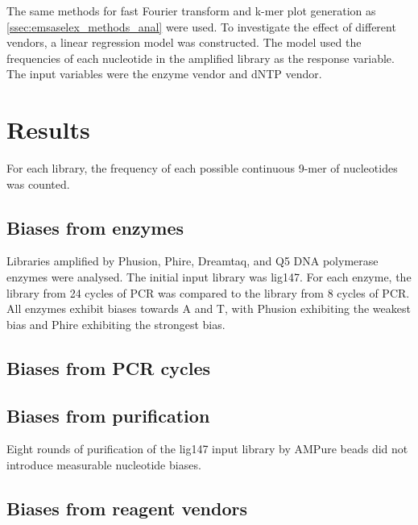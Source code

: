 \documentclass[parskip=full, numbers=noenddot]{scrreprt}
\begin{document}
The same methods for fast Fourier transform and k-mer plot generation as \ref{ssec:emsaselex_methods_anal} were used.
To investigate the effect of different vendors, a linear regression model was constructed.  The model used the frequencies of each nucleotide in the amplified library as the response variable.  The input variables were the enzyme vendor and dNTP vendor.

\section{Results}
\label{sec:pcrbias_results}

For each library, the frequency of each possible continuous 9-mer of nucleotides was counted.


\subsection{Biases from enzymes}
\label{ssec:pcrbias_result_enz}

Libraries amplified by Phusion, Phire, Dreamtaq, and Q5 DNA polymerase enzymes were analysed.  The initial input library was lig147.  For each enzyme, the library from 24 cycles of PCR was compared to the library from 8 cycles of PCR. %
All enzymes exhibit biases towards A and T, with Phusion exhibiting the weakest bias and Phire exhibiting the strongest bias.

\subsection{Biases from PCR cycles}
\label{ssec:pcrbias_result_pcr}

\subsection{Biases from purification}
\label{ssec:pcrbias_result_pur}

Eight rounds of purification of the lig147 input library by AMPure beads did not introduce measurable nucleotide biases.

\subsection{Biases from reagent vendors}
\label{ssec:pcrbias_result_reagent}
\end{document}

